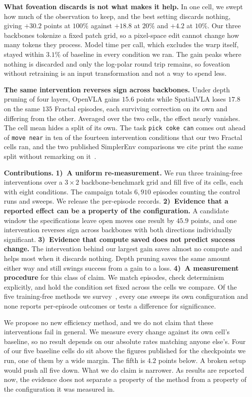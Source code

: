 \textbf{What foveation discards is not what makes it help.} In one cell, we
swept how much of the observation to keep, and the best setting discards
nothing, giving $+30.2$ points at $100\%$ against $+18.8$ at $20\%$ and $+4.2$
at $10\%$. Our three backbones tokenize a fixed patch grid, so a pixel-space
edit cannot change how many tokens they process. Model time per call, which
excludes the warp itself, stayed within $3.1\%$ of baseline in every condition
we ran. The gain peaks where nothing is discarded and only the log-polar round
trip remains, so foveation without retraining is an input transformation and
not a way to spend less.

\textbf{The same intervention reverses sign across backbones.} Under depth
pruning of four layers, OpenVLA gains $15.6$ points while SpatialVLA loses
$17.8$ on the same $135$ Fractal episodes, each surviving correction on its
own and differing from the other. Averaged over the two cells, the effect
nearly vanishes. The cell mean hides a split of its own. The task \texttt{pick
coke can} comes out ahead of \texttt{move near} in ten of the fourteen
intervention conditions that our two Fractal cells ran, and the two published
SimplerEnv comparisons we cite print the same split without remarking on
it~\cite{efficientvla, vlapruner}.

\textbf{Contributions.} \textbf{1)~A uniform re-measurement.} We run three
training-free interventions over a $3 \times 2$ backbone-benchmark grid and
fill five of its cells, each with eight conditions. The campaign totals
$6{,}910$ episodes counting the control runs and sweeps. We release the
per-episode records. \textbf{2)~Evidence that a reported effect can be a
property of the configuration.} A candidate window the specifications leave
open moves one result by $45.9$ points, and one intervention reverses sign
across backbones with both directions individually significant.
\textbf{3)~Evidence that compute saved does not predict success change.} The
intervention behind our largest gain saves almost no compute and helps most
when it discards nothing. Depth pruning saves the same amount either way and
still swings success from a gain to a loss. \textbf{4)~A measurement
procedure} for this class of claim. We match episodes, check determinism
explicitly, and hold the condition set fixed across the cells we compare. Of
the five training-free methods we survey~\cite{efficientvla, vlacache, fastv,
shortgpt, vlapruner}, every one sweeps its own configuration and none reports
per-episode outcomes or tests a difference for significance.

We propose no new efficiency method, and we do not claim that these
interventions fail in general. We measure every change against its own cell's
baseline, so no result depends on our absolute rates matching anyone else's.
Four of our five baseline cells do sit above the figures published for the
checkpoints we run, one of them by a wide margin. The fifth is $4.2$ points
below. A broken setup would push all five down. What we do claim is narrower.
As results are reported now, the evidence does not separate a property of the
method from a property of the configuration it was measured in.
